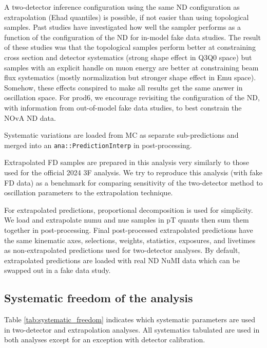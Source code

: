 \documentclass{article}
\begin{document}
A two-detector inference configuration using the same ND configuration as extrapolation (Ehad quantiles) is possible, if not easier than using topological samples. Past studies \cite{ref:two_det_nd_ehad_quants} have investigated how well the sampler performs as a function of the configuration of the ND for in-model fake data studies. The result of these studies was that the topological samples perform better at constraining cross section and detector systematics (strong shape effect in Q3Q0 space) but samples with an explicit handle on muon energy are better at constraining beam flux systematics (mostly normalization but stronger shape effect in Emu space). Somehow, these effects conspired to make all results get the same answer in oscillation space. For prod6, we encourage revisiting the configuration of the ND, with information from out-of-model fake data studies, to best constrain the NOvA ND data.

Systematic variations are loaded from MC as separate sub-predictions and merged into an \texttt{ana::\-Prediction\-Interp} in post-processing.

Extrapolated FD samples are prepared in this analysis very similarly to those used for the official 2024 3F analysis. We try to reproduce this analysis (with fake FD data) as a benchmark for comparing sensitivity of the two-detector method to oscillation parameters to the extrapolation technique.

For extrapolated predictions, proportional decomposition is used for simplicity. We load and extrapolate numu and nue samples in pT quants then sum them together in post-processing. Final post-processed extrapolated predictions have the same kinematic axes, selections, weights, statistics, exposures, and livetimes as non-extrapolated predictions used for two-detector analyses. By default, extrapolated predictions are loaded with real ND NuMI data which can be swapped out in a fake data study.

\subsection{Systematic freedom of the analysis}
\label{sec:systematic_freedom_of_the_analysis}
Table \ref{tab:systematic_freedom} indicates which systematic parameters are used in two-detector and extrapolation analyses. All systematics tabulated are used in both analyses except for an exception with detector calibration.
\end{document}
